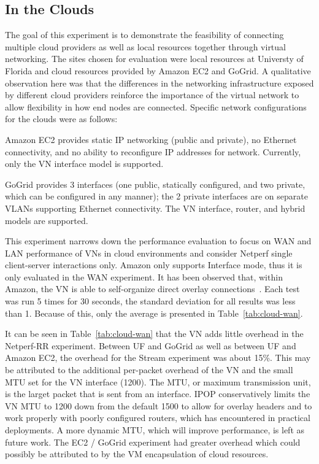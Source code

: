 \subsection{In the Clouds}
The goal of this experiment is to demonstrate the feasibility of connecting
multiple cloud providers as well as local resources together through virtual
networking.  The sites chosen for evaluation were local resources at Universty
of Florida and cloud resources provided by Amazon EC2 and GoGrid.  A
qualitative observation here was that the differences in the networking
infrastructure exposed by different cloud providers reinforce the importance
of the virtual network to allow flexibility in how end nodes are connected.
Specific network configurations for the clouds were as follows:
\begin{itemize}
\small{
\setlength{\itemsep}{0pt}
\setlength{\parskip}{0pt}
\item Amazon EC2 provides static IP networking (public and private), no
Ethernet connectivity, and no ability to reconfigure IP addresses for
network. Currently, only the VN interface model is supported.
\item GoGrid provides 3 interfaces (one public, statically configured,
and two private, which can be configured in any manner); the 2 private
interfaces are on separate VLANs supporting Ethernet connectivity. The
VN interface, router, and hybrid models are supported.
}
\end{itemize}

This experiment narrows down the performance evaluation to focus on WAN and LAN
performance of VNs in cloud environments and consider Netperf single
client-server interactions only. Amazon only supports Interface mode, thus it
is only evaluated in the WAN experiment. It has been observed that, within
Amazon, the VN is able to self-organize direct overlay connections~\cite{wow}.
Each test was run 5 times for 30 seconds, the standard deviation for all
results was less than 1.  Because of this, only the average is presented in
Table~\ref{tab:cloud-wan}.

It can be seen in Table~\ref{tab:cloud-wan} that the VN adds little
overhead in the Netperf-RR experiment. Between UF and GoGrid as well as between
UF and Amazon EC2, the overhead for the Stream experiment was about 15\%.  This
may be attributed to the additional per-packet overhead of the VN and the small
MTU set for the VN interface (1200).  The MTU, or maximum transmission unit, is
the larget packet that is sent from an interface.  IPOP conservatively limits
the VN MTU to 1200 down from the default 1500 to allow for overlay headers and
to work properly with poorly configured routers, which has encountered in
practical deployments.  A more dynamic MTU, which will improve performance, is
left as future work.  The EC2 / GoGrid experiment had greater overhead
which could possibly be attributed to by the VM encapsulation of cloud
resources.

